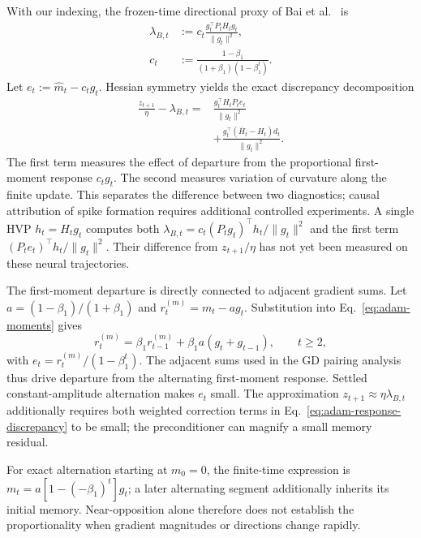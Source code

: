 With our indexing, the frozen-time directional proxy of
Bai et al.~\cite{bai2026adaptive} is
\begin{equation}
\begin{aligned}
\lambda_{B,t}
&:=c_t\frac{g_t^\top P_tH_tg_t}{\|g_t\|^2},\\
c_t&:=\frac{1-\beta_1}{(1+\beta_1)(1-\beta_1^t)}.
\end{aligned}
\label{eq:adam-bai-reference}
\end{equation}
Let $e_t:=\widehat m_t-c_tg_t$. Hessian symmetry yields the exact
discrepancy decomposition
\begin{equation}
\begin{aligned}
\frac{z_{t+1}}{\eta}-\lambda_{B,t}
={}&\frac{g_t^\top H_tP_te_t}{\|g_t\|^2}\\
&+\frac{g_t^\top(\overline H_t-H_t)d_t}{\|g_t\|^2}.
\end{aligned}
\label{eq:adam-response-discrepancy}
\end{equation}
The first term measures the effect of departure from the proportional
first-moment response $c_tg_t$. The second measures variation of curvature
along the finite update. This separates the difference between two
diagnostics; causal attribution of spike formation requires additional
controlled experiments. A single HVP $h_t=H_tg_t$ computes both
$\lambda_{B,t}=c_t(P_tg_t)^\top h_t/\|g_t\|^2$ and the first term
$(P_te_t)^\top h_t/\|g_t\|^2$. Their difference from $z_{t+1}/\eta$
has not yet been measured on these neural trajectories.

The first-moment departure is directly connected to adjacent gradient
sums. Let $a=(1-\beta_1)/(1+\beta_1)$ and $r_t^{(m)}=m_t-ag_t$. Substitution
into Eq.~\eqref{eq:adam-moments} gives
\begin{equation}
r_t^{(m)}=\beta_1r_{t-1}^{(m)}+\beta_1a(g_t+g_{t-1}),
\qquad t\ge2,
\label{eq:adam-memory-residual}
\end{equation}
with $e_t=r_t^{(m)}/(1-\beta_1^t)$. The adjacent sums used in the GD pairing
analysis thus drive departure from the alternating first-moment response.
Settled constant-amplitude alternation makes $e_t$ small. The approximation
$z_{t+1}\approx\eta\lambda_{B,t}$ additionally requires both weighted
correction terms in Eq.~\eqref{eq:adam-response-discrepancy} to be small;
the preconditioner can magnify a small memory residual.

For exact alternation starting at $m_0=0$, the finite-time expression is
$m_t=a[1-(-\beta_1)^t]g_t$; a later alternating segment additionally
inherits its initial memory. Near-opposition alone therefore does not
establish the proportionality when gradient magnitudes or directions
change rapidly.

